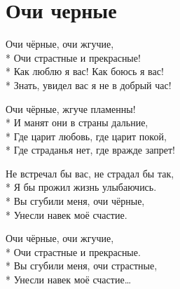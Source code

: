 \vspace{\fill}\newpage

\section{Очи черные}
\label{song:Очи_черные}

\medskip

\begin{minipage}{\linewidth}
Очи чёрные, очи жгучие,\\*
Очи страстные и прекрасные!\\*
Как люблю я вас! Как боюсь я вас!\\*
Знать, увидел вас я не в добрый час!\\
\end{minipage}\par\medskip\nobreak

\medskip

\begin{minipage}{\linewidth}
Очи чёрные, жгуче пламенны!\\*
И манят они в страны дальние,\\*
Где царит любовь, где царит покой,\\*
Где страданья нет, где вражде запрет!\\
\end{minipage}\par\medskip\nobreak

\medskip

\begin{minipage}{\linewidth}
Не встречал бы вас, не страдал бы так,\\*
Я бы прожил жизнь улыбаючись.\\*
Вы сгубили меня, очи чёрные,\\*
Унесли навек моё счастие.\\
\end{minipage}\par\medskip\nobreak

\medskip

\begin{minipage}{\linewidth}
Очи чёрные, очи жгучие,\\*
Очи страстные и прекрасные.\\*
Вы сгубили меня, очи страстные,\\*
Унесли навек моё счастие…\\
\end{minipage}

